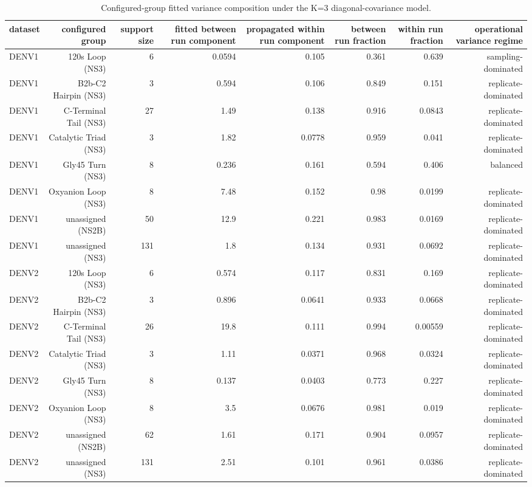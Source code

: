 \begin{table}[t]
  \centering
  \caption{Configured-group fitted variance composition under the K=3 diagonal-covariance model.}
  \label{tab:variance_composition}
  \begin{tabular}{lrrrrrrr}
    \toprule
    dataset & configured group & support size & fitted between run component & propagated within run component & between run fraction & within run fraction & operational variance regime \\
    \midrule
    DENV1 & 120s Loop (NS3) & 6 & 0.0594 & 0.105 & 0.361 & 0.639 & sampling-dominated \\
    DENV1 & B2b-C2 Hairpin (NS3) & 3 & 0.594 & 0.106 & 0.849 & 0.151 & replicate-dominated \\
    DENV1 & C-Terminal Tail (NS3) & 27 & 1.49 & 0.138 & 0.916 & 0.0843 & replicate-dominated \\
    DENV1 & Catalytic Triad (NS3) & 3 & 1.82 & 0.0778 & 0.959 & 0.041 & replicate-dominated \\
    DENV1 & Gly45 Turn (NS3) & 8 & 0.236 & 0.161 & 0.594 & 0.406 & balanced \\
    DENV1 & Oxyanion Loop (NS3) & 8 & 7.48 & 0.152 & 0.98 & 0.0199 & replicate-dominated \\
    DENV1 & unassigned (NS2B) & 50 & 12.9 & 0.221 & 0.983 & 0.0169 & replicate-dominated \\
    DENV1 & unassigned (NS3) & 131 & 1.8 & 0.134 & 0.931 & 0.0692 & replicate-dominated \\
    DENV2 & 120s Loop (NS3) & 6 & 0.574 & 0.117 & 0.831 & 0.169 & replicate-dominated \\
    DENV2 & B2b-C2 Hairpin (NS3) & 3 & 0.896 & 0.0641 & 0.933 & 0.0668 & replicate-dominated \\
    DENV2 & C-Terminal Tail (NS3) & 26 & 19.8 & 0.111 & 0.994 & 0.00559 & replicate-dominated \\
    DENV2 & Catalytic Triad (NS3) & 3 & 1.11 & 0.0371 & 0.968 & 0.0324 & replicate-dominated \\
    DENV2 & Gly45 Turn (NS3) & 8 & 0.137 & 0.0403 & 0.773 & 0.227 & replicate-dominated \\
    DENV2 & Oxyanion Loop (NS3) & 8 & 3.5 & 0.0676 & 0.981 & 0.019 & replicate-dominated \\
    DENV2 & unassigned (NS2B) & 62 & 1.61 & 0.171 & 0.904 & 0.0957 & replicate-dominated \\
    DENV2 & unassigned (NS3) & 131 & 2.51 & 0.101 & 0.961 & 0.0386 & replicate-dominated \\

\end{tabular}
\end{table}
